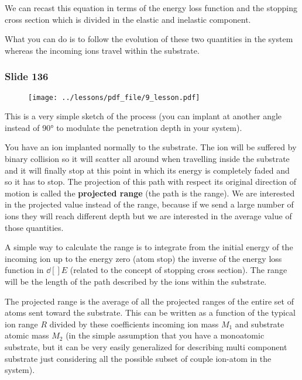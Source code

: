 \documentclass[../main/main.tex]{subfiles}
\begin{document}
We can recast this equation in terms of the energy loss function and the stopping cross section which is divided in the elastic and inelastic component.

What you can do is to follow the evolution of these two quantities in the system whereas the incoming ions travel within the substrate.

\newpage

\subsubsection{Slide 136}

\begin{figure}[h!]
\centering
\texttt{[image: ../lessons/pdf\_file/9\_lesson.pdf]}
\end{figure}

This is a very simple sketch of the process (you can implant at another angle instead of 90° to modulate the penetration depth in your system).

You have an ion implanted normally to the substrate. The ion will be suffered by binary collision so it will scatter all around when travelling inside the substrate and it will finally stop at this point in which its energy is completely faded and so it has to stop.
The projection of this path with respect its original direction of motion is called the \textbf{projected range} (the path is the range). We are interested in the projected value instead of the range, because if we send a large number of ions they will reach different depth but we are interested in the average value of those quantities.

A simple way to calculate the range is to integrate from the initial energy of the incoming ion up to the energy zero (atom stop) the inverse of the energy loss function in \( \dd[]{E}  \) (related to the concept of stopping cross section). The range will be the length of the path described by the ions within the substrate.

The projected range is the average of all the projected ranges of the entire set of atoms sent toward the substrate. This can be written as a function of the typical ion range \( R \) divided by these coefficients incoming ion mass \( M_1 \) and substrate atomic mass \( M_2 \) (in the simple assumption that you have a monoatomic substrate, but it can be very easily generalized for describing multi component substrate just considering all the possible subset of couple ion-atom in the system).
\end{document}
